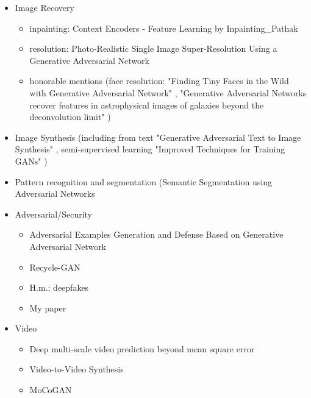 \documentclass[11pt]{article}
\begin{document}
\begin{itemize}
\begin{itemize}
        \item Image Recovery 
        \begin{itemize}
            \item inpainting: Context Encoders - Feature Learning by Inpainting\_Pathak \cite{pathakCVPR16context}
            \item resolution: Photo-Realistic Single Image Super-Resolution Using a Generative Adversarial Network \cite{ledig2017photo}
            \item honorable mentions (face resolution: "Finding Tiny Faces in the Wild with Generative Adversarial Network" \cite{bai2018finding}, "Generative Adversarial Networks recover features in astrophysical images of galaxies beyond the deconvolution limit" \cite{schawinski2017generative})
        \end{itemize}
        
        \item Image Synthesis (including from text "Generative Adversarial Text to Image Synthesis" \cite{reed2016generative}, semi-supervised learning "Improved Techniques for Training GANs" \cite{salimans2016improved})
        
        \item Pattern recognition and segmentation (Semantic Segmentation using Adversarial Networks \cite{Luc2016SemanticSU} 
        
        \item Adversarial/Security
        \begin{itemize}
            \item Adversarial Examples Generation and Defense Based on Generative Adversarial Network \cite{xia2016adversarial}
            \item Recycle-GAN \cite{bansal2018recyclegan}
            \item H.m.: deepfakes \cite{deepfakes-faceswap}
            \item My paper
        \end{itemize}
        
        \item Video
        \begin{itemize}
        \item Deep multi-scale video prediction beyond mean square error \cite{Mathieu2015DeepMV}
        \item Video-to-Video Synthesis \cite{wang2018videotovideo}
            \item MoCoGAN \cite{tulyakov2017mocogan}
        \end{itemize}
        

\end{itemize}
\end{itemize}
\end{document}
